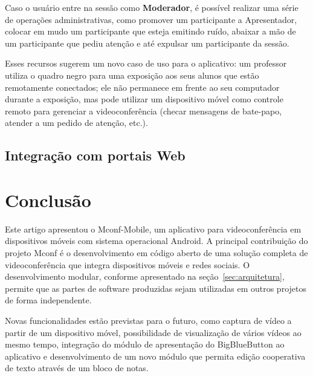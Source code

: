 \documentclass{acm_proc_article-sp}
\begin{document}
Caso o usuário entre na sessão como \textbf{Moderador}, é possível realizar uma série de operações administrativas, como promover um participante a Apresentador, colocar em mudo um participante que esteja emitindo ruído, abaixar a mão de um participante que pediu atenção e até expulsar um participante da sessão. 

Esses recursos sugerem um novo caso de uso para o aplicativo: um professor utiliza o quadro negro para uma exposição aos seus alunos que estão remotamente conectados; ele não permanece em frente ao seu computador durante a exposição, mas pode utilizar um dispositivo móvel como controle remoto para gerenciar a videoconferência (checar mensagens de bate-papo, atender a um pedido de atenção, etc.).


\subsection{Integração com portais Web}

\section{Conclusão}

Este artigo apresentou o Mconf-Mobile, um aplicativo para videoconferência em dispositivos móveis com sistema operacional Android. A principal contribuição do projeto Mconf é o desenvolvimento em código aberto de uma solução completa de videoconferência que integra dispositivos móveis e redes sociais. O desenvolvimento modular, conforme apresentado na seção~\ref{sec:arquitetura}, permite que as partes de software produzidas sejam utilizadas em outros projetos de forma independente.

Novas funcionalidades estão previstas para o futuro, como captura de vídeo a partir de um dispositivo móvel, possibilidade de visualização de vários vídeos ao mesmo tempo, integração do módulo de apresentação do BigBlueButton ao aplicativo e desenvolvimento de um novo módulo que permita edição cooperativa de texto através de um bloco de notas. 

%

%
%
\balancecolumns
\end{document}
